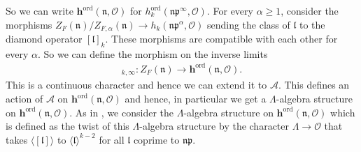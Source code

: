 \documentclass[reqno,10pt]{amsart}
\newcommand{\h}{\mathbf{h}}
\newcommand{\mcO}{\mathcal{O}}
\newcommand{\mcA}{\mathcal{A}}
\newcommand{\p}{\mathfrak{p}}
\newcommand{\n}{\mathfrak{n}}
\newcommand{\ml}{\mathfrak{l}}
\theoremstyle{plain}
\theoremstyle{definition}
\begin{document}
So we can write $\h^{\mathrm{ord}}(\n,\mcO)$ for $h_{k}^{\mathrm{ord}}(\n\p^\infty,\mcO).$ For every $\alpha \geq 1$, consider the morphisms $Z_F(\n)/Z_{F,\alpha}(\n) \rightarrow h_k(\n \p^\alpha, \mcO)$ sending the class of $\ml$ to the diamond operator $[\ml]_k$. These morphisms are compatible with each other for every $\alpha$. So we can define the morphism on the inverse limits
\begin{align*}
    [\cdot]_{k,\infty} : Z_F(\n) \rightarrow \h^{\mathrm{ord}}(\n,\mcO).
\end{align*}
This is a continuous character and hence we can extend it to $\mcA$. This defines an action of $\mcA$ on $\h^{\mathrm{ord}}(\n,\mcO)$ and hence, in particular we get a $\Lambda$-algebra structure on $\h^{\mathrm{ord}}(\n,\mcO)$. As in \cite[Section 4.1]{MokExceptionalZero}, we consider the $\Lambda$-algebra structure on $\h^{\mathrm{ord}}(\n,\mcO)$ which is defined as the twist of this $\Lambda$-algebra structure by the character $\Lambda \rightarrow \mcO$ that takes $\langle [\ml] \rangle$ to $\langle \ml \rangle^{k-2}$ for all $\ml$ coprime to $\n\p$.
\end{document}

